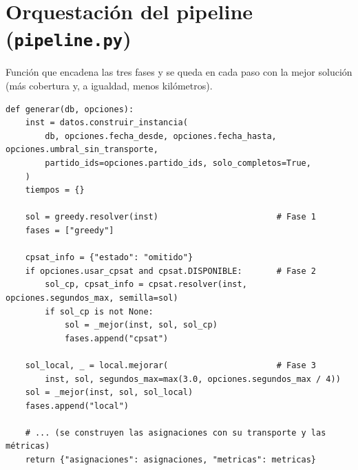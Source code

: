 \documentclass[11pt,a4paper,spanish]{book}
\numberwithin{equation}{chapter}
\numberwithin{figure}{chapter}
\numberwithin{table}{chapter}
\begin{document}
\section{Orquestación del pipeline (\texttt{pipeline.py})}

Función que encadena las tres fases y se queda en cada paso con la mejor solución (más cobertura y, a igualdad, menos kilómetros).

\begin{lstlisting}[caption={\texttt{pipeline.py} --- encadenado de las tres fases.}]
def generar(db, opciones):
    inst = datos.construir_instancia(
        db, opciones.fecha_desde, opciones.fecha_hasta, opciones.umbral_sin_transporte,
        partido_ids=opciones.partido_ids, solo_completos=True,
    )
    tiempos = {}

    sol = greedy.resolver(inst)                        # Fase 1
    fases = ["greedy"]

    cpsat_info = {"estado": "omitido"}
    if opciones.usar_cpsat and cpsat.DISPONIBLE:       # Fase 2
        sol_cp, cpsat_info = cpsat.resolver(inst, opciones.segundos_max, semilla=sol)
        if sol_cp is not None:
            sol = _mejor(inst, sol, sol_cp)
            fases.append("cpsat")

    sol_local, _ = local.mejorar(                      # Fase 3
        inst, sol, segundos_max=max(3.0, opciones.segundos_max / 4))
    sol = _mejor(inst, sol, sol_local)
    fases.append("local")

    # ... (se construyen las asignaciones con su transporte y las métricas)
    return {"asignaciones": asignaciones, "metricas": metricas}
\end{lstlisting}
\end{document}
